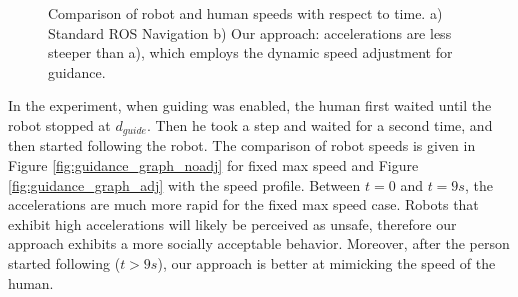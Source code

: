 \begin{figure}[ht!]
\centering
%
        
    \caption{%
	Comparison of robot and human speeds with respect to time. a) Standard ROS Navigation b) Our approach: accelerations are less steeper than a), which employs the dynamic speed adjustment for guidance.
     }%
   \label{fig:guidance_performance_graph}
\end{figure}

In the experiment, when guiding was enabled, the human first waited until the robot stopped at $d_{guide}$. Then he took a step and waited for a second time, and then started following the robot. The comparison of robot speeds is given in Figure \ref{fig:guidance_graph_noadj} for fixed max speed and Figure \ref{fig:guidance_graph_adj} with the speed profile. Between $t=0$ and $t=9s$, the accelerations are much more rapid for the fixed max speed case. Robots that exhibit high accelerations will likely be perceived as unsafe, therefore our approach exhibits a more socially acceptable behavior. Moreover, after the person started following ($t >9s$), our approach is better at mimicking the speed of the human.



